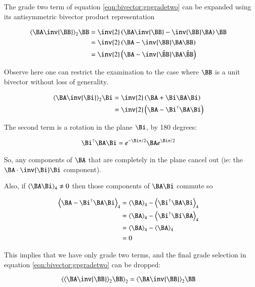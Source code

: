 The grade two term of equation \ref{eqn:bivector:gpgradetwo} can be expanded using its antisymmetric bivector product representation

\begin{align*}
\gpgradetwo{\BA\inv{\BB}} \BB
&= \inv{2}\left(\BA\inv{\BB} - \inv{\BB}\BA\right) \BB \\
&= \inv{2}\left(\BA - \inv{\BB}\BA \BB\right) \\
&= \inv{2}\left(\BA - \inv{\hat{\BB}}\BA \hat{\BB}\right) \\
\end{align*}

Observe here one can restrict the examination to the case where $\BB$ is a unit bivector without loss of generality.

\begin{align*}
\gpgradetwo{\BA\inv{\Bi}} \Bi
&= \inv{2}\left(\BA + \Bi\BA\Bi\right) \\
&= \inv{2}\left(\BA - \Bi^\dagger\BA\Bi\right) \\
\end{align*}

The second term is a rotation in the plane $\Bi$, by 180 degrees:

\begin{align*}
\Bi^\dagger\BA\Bi = e^{-\Bi \pi/2}\BA e^{\Bi \pi/2}
\end{align*}

So, any components of $\BA$ that are completely in the plane cancel out (ie: the $\BA \cdot \inv{\Bi}\Bi$ component).

Also, if $\gpgradefour{\BA \Bi} \ne 0$ then those components of $\BA \Bi$ commute so

\begin{align*}
\gpgradefour{\BA - \Bi^\dagger\BA\Bi}
&= \gpgradefour{\BA} - \gpgradefour{\Bi^\dagger\BA\Bi} \\
&= \gpgradefour{\BA} - \gpgradefour{\Bi^\dagger\Bi\BA} \\
&= \gpgradefour{\BA} - \gpgradefour{\BA} \\
&= 0 \\
\end{align*}

This implies that we have only grade two terms, and the final grade selection in equation \ref{eqn:bivector:gpgradetwo} can be dropped:

\begin{equation}
\label{eqn:bivector:simplergpgradetwo}
\gpgradetwo{\gpgradetwo{\BA\inv{\BB}} \BB} = \gpgradetwo{\BA\inv{\BB}} \BB
\end{equation}

